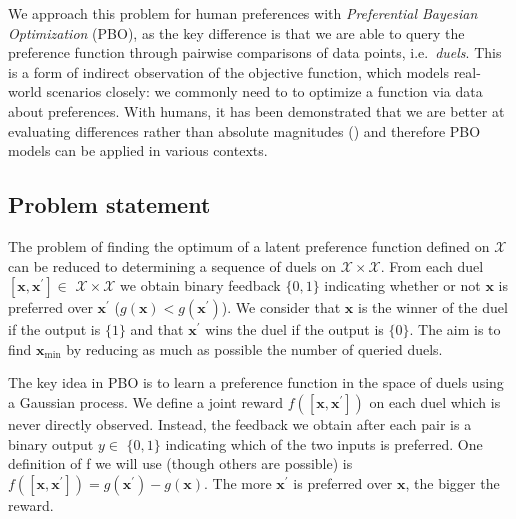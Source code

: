 \documentclass[
  letterpaper,
  DIV=11,
  numbers=noendperiod,
  oneside]{scrreprt}
\theoremstyle{remark}
\begin{document}
We approach this problem for human preferences with \emph{Preferential
Bayesian Optimization} (PBO), as the key difference is that we are able
to query the preference function through pairwise comparisons of data
points, i.e.~\emph{duels}. This is a form of indirect observation of the
objective function, which models real-world scenarios closely: we
commonly need to to optimize a function via data about preferences. With
humans, it has been demonstrated that we are better at evaluating
differences rather than absolute magnitudes
() and
therefore PBO models can be applied in various contexts.

\subsection{Problem statement}\label{problem-statement}

The problem of finding the optimum of a latent preference function
defined on \(\mathcal{X}\) can be reduced to determining a sequence of
duels on \(\mathcal{X} \times \mathcal{X}\). From each duel
\(\left[\mathbf{x}, \mathbf{x}^{\prime}\right] \in\)
\(\mathcal{X} \times \mathcal{X}\) we obtain binary feedback \(\{0,1\}\)
indicating whether or not \(\mathbf{x}\) is preferred over
\(\mathbf{x}^{\prime}\) (\(g(\mathbf{x}) < g(\mathbf{x}^{\prime})\)). We
consider that \(\mathbf{x}\) is the winner of the duel if the output is
\(\{1\}\) and that \(\mathbf{x}^{\prime}\) wins the duel if the output
is \(\{0\}\). The aim is to find \(\mathbf{x}_{\min }\) by reducing as
much as possible the number of queried duels.

The key idea in PBO is to learn a preference function in the space of
duels using a Gaussian process. We define a joint reward
\(f\left(\left[\mathbf{x}, \mathbf{x}^{\prime}\right]\right)\) on each
duel which is never directly observed. Instead, the feedback we obtain
after each pair is a binary output \(y \in\) \(\{0,1\}\) indicating
which of the two inputs is preferred. One definition of f we will use
(though others are possible) is
\(f\left(\left[\mathbf{x}, \mathbf{x}^{\prime}\right]\right)=g\left(\mathbf{x}^{\prime}\right)-g(\mathbf{x})\).
The more \(\mathbf{x}^{\prime}\) is preferred over \(\mathbf{x}\), the
bigger the reward.
\end{document}
